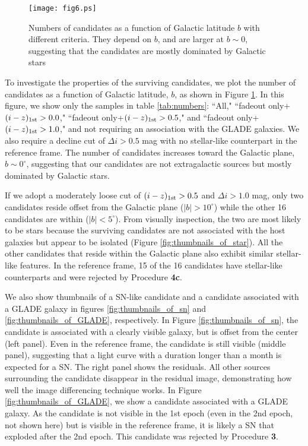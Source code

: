 \documentclass[]{pasj01}
\begin{document}
\begin{figure}
 \begin{center}
   \texttt{[image: fig6.ps]} 
 \end{center}
\caption{
Numbers of candidates as a function of Galactic latitude $b$ with different criteria. 
They depend on $b$, and are larger at $b\sim0$, suggesting that the candidates are mostly dominated by Galactic stars}
\label{fig:number_as_b}
\end{figure}
To investigate the properties of the surviving candidates, we plot the number of candidates as a function of Galactic latitude, $b$, as shown in Figure \ref{fig:number_as_b}.
In this figure, we show only the samples in table \ref{tab:numbers}: ``All," ``fadeout only+$(i-z)_{\rm 1st}>0.0$,"  ``fadeout only+$(i-z)_{\rm 1st}>0.5$," and ``fadeout only+$(i-z)_{\rm 1st}>1.0$," and not requiring an association with the GLADE galaxies.
We also require a decline cut of $\Delta i>0.5$ mag with no stellar-like counterpart in the reference frame.
The number of candidates increases toward the Galactic plane, $b\sim0^{\circ}$,
suggesting that our candidates are not extragalactic sources but mostly dominated by Galactic stars.

If we adopt a moderately loose cut of $(i-z)_{\rm 1st}>0.5$ and $\Delta i>1.0$ mag,
only two candidates reside offset from the Galactic plane ($|b|>10^{\circ}$)
while the other 16 candidates are within ($|b|<5^{\circ}$).
From visually inspection,
the two are most likely to be stars because the surviving candidates are not associated with the host galaxies but appear to be isolated (Figure \ref{fig:thumbnails_of_star}).
All the other candidates that reside within the Galactic plane also exhibit similar stellar-like features.
In the reference frame, 15 of the 16 candidates have stellar-like counterparts and were rejected by Procedure {\bf 4c}.


We also show thumbnails of a SN-like candidate and a candidate associated with a GLADE galaxy in figures \ref{fig:thumbnails_of_sn} and \ref{fig:thumbnails_of_GLADE}, respectively.
In Figure \ref{fig:thumbnails_of_sn}, the candidate is associated with a clearly visible galaxy, but is offset from the center (left panel). Even in the reference frame, the candidate is still visible (middle panel), suggesting that a light curve with a duration longer than  a month is expected for a SN. The right panel shows the residuals. All other sources surrounding the candidate disappear in the residual image, demonstrating how well the image differencing technique works.
In Figure \ref{fig:thumbnails_of_GLADE}, we show a candidate associated with a GLADE galaxy. As the candidate is not visible in the 1st epoch (even in the 2nd epoch, not shown here) but is visible in the reference frame, it is likely a SN that exploded after the 2nd epoch. This candidate was rejected by Procedure {\bf 3}.
\end{document}
